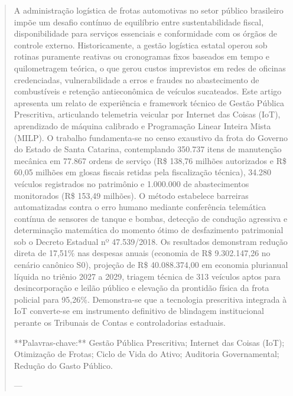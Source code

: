 \documentclass[10pt,a4paper,journal]{article}
\begin{document}
\begin{abstract}
A administração logística de frotas automotivas no setor público brasileiro impõe um desafio contínuo de equilíbrio entre sustentabilidade fiscal, disponibilidade para serviços essenciais e conformidade com os órgãos de controle externo. Historicamente, a gestão logística estatal operou sob rotinas puramente reativas ou cronogramas fixos baseados em tempo e quilometragem teórica, o que gerou custos imprevistos em redes de oficinas credenciadas, vulnerabilidade a erros e fraudes no abastecimento de combustíveis e retenção antieconômica de veículos sucateados. Este artigo apresenta um relato de experiência e framework técnico de Gestão Pública Prescritiva, articulando telemetria veicular por Internet das Coisas (IoT), aprendizado de máquina calibrado e Programação Linear Inteira Mista (MILP). O trabalho fundamenta-se no censo exaustivo da frota do Governo do Estado de Santa Catarina, contemplando 350.737 itens de manutenção mecânica em 77.867 ordens de serviço (R\$ 138,76 milhões autorizados e R\$ 60,05 milhões em glosas fiscais retidas pela fiscalização técnica), 34.280 veículos registrados no patrimônio e 1.000.000 de abastecimentos monitorados (R\$ 153,49 milhões). O método estabelece barreiras automatizadas contra o erro humano mediante conferência telemática contínua de sensores de tanque e bombas, detecção de condução agressiva e determinação matemática do momento ótimo de desfazimento patrimonial sob o Decreto Estadual nº 47.539/2018. Os resultados demonstram redução direta de 17,51\% nas despesas anuais (economia de R\$ 9.302.147,26 no cenário canônico S0), projeção de R\$ 40.088.374,00 em economia plurianual líquida no triênio 2027 a 2029, triagem técnica de 313 veículos aptos para desincorporação e leilão público e elevação da prontidão física da frota policial para 95,26\%. Demonstra-se que a tecnologia prescritiva integrada à IoT converte-se em instrumento definitivo de blindagem institucional perante os Tribunais de Contas e controladorias estaduais.

**Palavras-chave:** Gestão Pública Prescritiva; Internet das Coisas (IoT); Otimização de Frotas; Ciclo de Vida do Ativo; Auditoria Governamental; Redução do Gasto Público.

---

\end{abstract}
\end{document}
